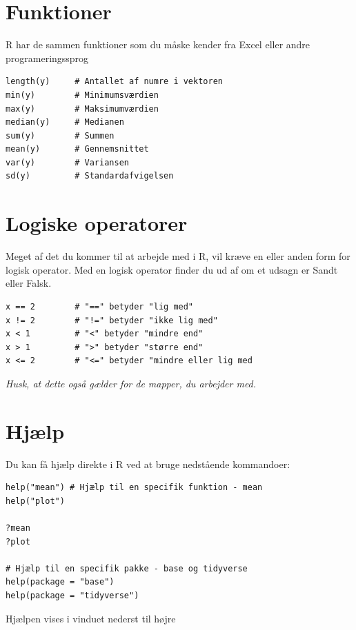 \documentclass[
]{book}
\begin{document}
\hypertarget{funktioner}{%
\section{Funktioner}\label{funktioner}}

R har de sammen funktioner som du måske kender fra Excel eller andre programeringssprog

\begin{verbatim}
length(y)     # Antallet af numre i vektoren
min(y)        # Minimumsværdien
max(y)        # Maksimumværdien
median(y)     # Medianen
sum(y)        # Summen
mean(y)       # Gennemsnittet
var(y)        # Variansen
sd(y)         # Standardafvigelsen
\end{verbatim}

\hypertarget{logiske-operatorer}{%
\section{Logiske operatorer}\label{logiske-operatorer}}

Meget af det du kommer til at arbejde med i R, vil kræve en eller anden form for logisk operator. Med en logisk operator finder du ud af om et udsagn er Sandt eller Falsk.

\begin{verbatim}
x == 2        # "==" betyder "lig med"
x != 2        # "!=" betyder "ikke lig med"
x < 1         # "<" betyder "mindre end"
x > 1         # ">" betyder "større end"
x <= 2        # "<=" betyder "mindre eller lig med
\end{verbatim}

\emph{Husk, at dette også gælder for de mapper, du arbejder med.}

\hypertarget{hjuxe6lp}{%
\section{Hjælp}\label{hjuxe6lp}}

Du kan få hjælp direkte i R ved at bruge nedstående kommandoer:

\begin{verbatim}
help("mean") # Hjælp til en specifik funktion - mean
help("plot")

?mean 
?plot

# Hjælp til en specifik pakke - base og tidyverse
help(package = "base")
help(package = "tidyverse")
\end{verbatim}

Hjælpen vises i vinduet nederst til højre
\end{document}
